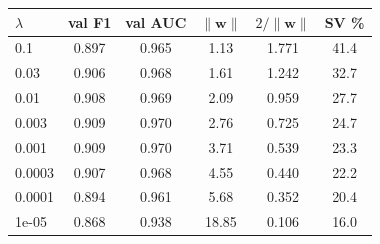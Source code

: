 \begin{tabular}{@{}lccccc@{}}
\toprule
$\lambda$ & val F1 & val AUC & $\|\mathbf{w}\|$ & $2/\|\mathbf{w}\|$ & SV \% \\
\midrule
0.1 & 0.897 & 0.965 & 1.13 & 1.771 & 41.4 \\
0.03 & 0.906 & 0.968 & 1.61 & 1.242 & 32.7 \\
0.01 & 0.908 & 0.969 & 2.09 & 0.959 & 27.7 \\
0.003 & 0.909 & 0.970 & 2.76 & 0.725 & 24.7 \\
0.001 & 0.909 & 0.970 & 3.71 & 0.539 & 23.3 \\
0.0003 & 0.907 & 0.968 & 4.55 & 0.440 & 22.2 \\
0.0001 & 0.894 & 0.961 & 5.68 & 0.352 & 20.4 \\
1e-05 & 0.868 & 0.938 & 18.85 & 0.106 & 16.0 \\
\bottomrule
\end{tabular}
